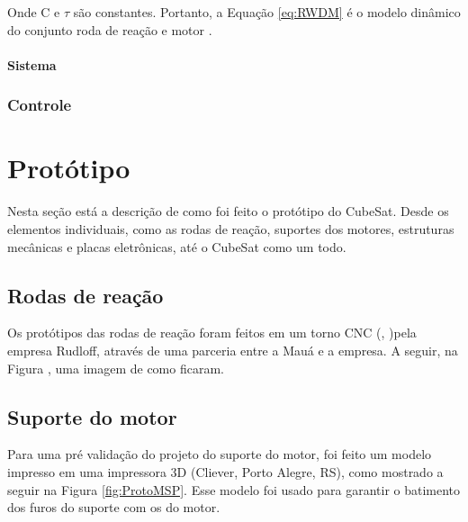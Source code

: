 \documentclass[
	12pt,				%
	openany,			%
	twoside,			%
	a4paper,			%
	english,			%
	french,				%
	spanish,			%
	brazil,				%
	oldfontcommands
	]{abntex2}
\begin{document}
Onde C e $\tau$ são constantes. Portanto, a Equação \ref{eq:RWDM} é o modelo dinâmico do conjunto roda de reação e motor \cite{Ericksson}.

\subsubsection{Sistema}



\subsection{Controle}



\chapter[Protótipo]{Protótipo}

Nesta seção está a descrição de como foi feito o protótipo do CubeSat. Desde os elementos individuais, como as rodas de reação, suportes dos motores, estruturas mecânicas e placas eletrônicas, até o CubeSat como um todo.

\section{Rodas de reação}

Os protótipos das rodas de reação foram feitos em um torno CNC (, )pela empresa Rudloff, através de uma parceria entre a Mauá e a empresa. A seguir, na Figura , uma imagem de como ficaram.

%	

\section{Suporte do motor}

Para uma pré validação do projeto do suporte do motor, foi feito um modelo impresso em uma impressora 3D (Cliever, Porto Alegre, RS), como mostrado a seguir na Figura \ref{fig:ProtoMSP}. Esse modelo foi usado para garantir o batimento dos furos do suporte com os do motor.
\end{document}
